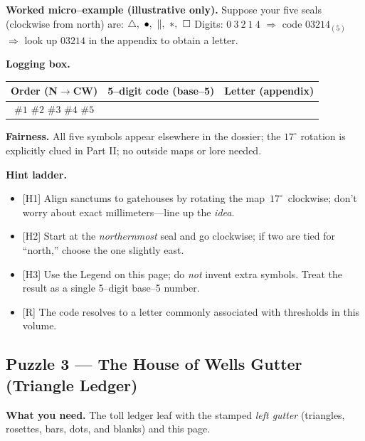 \documentclass[11pt]{article}
\begin{document}
\begin{itemize}
\medskip
\noindent\textbf{Worked micro–example (illustrative only).}  
Suppose your five seals (clockwise from north) are: \(\triangle,\ \bullet,\ \Vert,\ \large\ast,\ \square\)  
Digits: \(0\ 3\ 2\ 1\ 4\) \(\Rightarrow\) code \(03214_{(5)}\) \(\Rightarrow\) look up \(03214\) in the appendix to obtain a letter.

\medskip
\noindent\textbf{Logging box.}
\begin{center}
\begin{tabular}{c|c|c}
\textbf{Order (N\(\rightarrow\)CW)} & \textbf{5–digit code (base–5)} & \textbf{Letter (appendix)} \\
\hline
\(\#1\) \(\#2\) \(\#3\) \(\#4\) \(\#5\) & \hspace{3.5cm} & \hspace{1.2cm} \\
\end{tabular}
\end{center}

\medskip
\noindent\textbf{Fairness.} All five symbols appear elsewhere in the dossier; the \(17^\circ\) rotation is explicitly clued in Part II; no outside maps or lore needed.

\medskip
\noindent\textbf{Hint ladder.}
\begin{itemize}\setlength\itemsep{0.25em}
  \item \textsc{[H1]} Align sanctums to gatehouses by rotating the map \(\,17^\circ\,\) clockwise; don’t worry about exact millimeters—line up the \emph{idea}.
  \item \textsc{[H2]} Start at the \emph{northernmost} seal and go clockwise; if two are tied for “north,” choose the one slightly east.
  \item \textsc{[H3]} Use the Legend on this page; do \emph{not} invent extra symbols. Treat the result as a single 5–digit base–5 number.
  \item \textsc{[R]} The code resolves to a letter commonly associated with thresholds in this volume.
\end{itemize}

\subsection{Puzzle 3 — The House of Wells Gutter (Triangle Ledger)}
\label{pz:triangle-ledger}

\noindent\textbf{What you need.} The toll ledger leaf with the stamped \emph{left gutter} (triangles, rosettes, bars, dots, and blanks) and this page.


\end{itemize}
\end{document}
